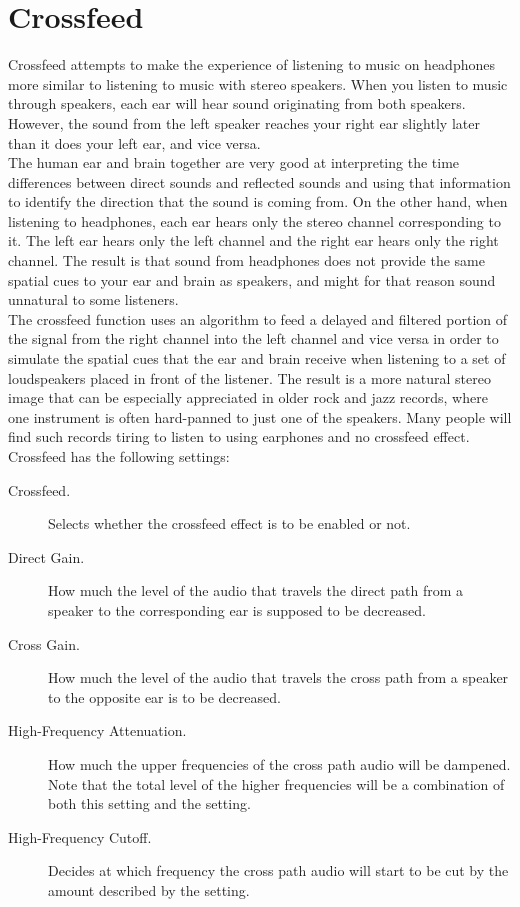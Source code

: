 \section{Crossfeed}
  Crossfeed attempts to make the experience of listening to music on
  headphones more similar to listening to music with stereo speakers. When you
  listen to music through speakers, each ear will hear sound originating from
  both speakers. However, the sound from the left speaker reaches your right
  ear slightly later than it does your left ear, and vice versa.\\

  The human ear and brain together are very good at interpreting the time
  differences between direct sounds and reflected sounds and using that
  information to identify the direction that the sound is coming from. On the
  other hand, when listening to headphones, each ear hears only the stereo
  channel corresponding to it. The left ear hears only the left channel and
  the right ear hears only the right channel. The result is that sound from
  headphones does not provide the same spatial cues to your ear and brain as
  speakers, and might for that reason sound unnatural to some listeners.\\

  The crossfeed function uses an algorithm to feed a delayed and filtered
  portion of the signal from the right channel into the left channel and vice
  versa in order to simulate the spatial cues that the ear and brain receive
  when listening to a set of loudspeakers placed in front of the listener. The
  result is a more natural stereo image that can be especially appreciated in
  older rock and jazz records, where one instrument is often hard-panned to
  just one of the speakers. Many people will find such records tiring to listen
  to using earphones and no crossfeed effect.\\

  Crossfeed has the following settings:
  \begin{description}
  \item[Crossfeed.]
    Selects whether the crossfeed effect is to be enabled or not.
  \item[Direct Gain.]
    How much the level of the audio that travels the direct path from a speaker
    to the corresponding ear is supposed to be decreased.
  \item[Cross Gain.]
    How much the level of the audio that travels the cross path from a speaker
    to the opposite ear is to be decreased.
  \item[High-Frequency Attenuation.]
    How much the upper frequencies of the cross path audio will be dampened.
    Note that the total level of the higher frequencies will be a combination
    of both this setting and the  setting.
  \item[High-Frequency Cutoff.]
    Decides at which frequency the cross path audio will start to be cut
    by the amount described by the 
    setting.
  \end{description}

